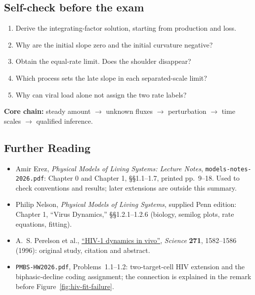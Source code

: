 \subsection*{Self-check before the exam}
\begin{enumerate}
\item Derive the integrating-factor solution, starting from production and loss.
\item Why are the initial slope zero and the initial curvature negative?
\item Obtain the equal-rate limit. Does the shoulder disappear?
\item Which process sets the late slope in each separated-scale limit?
\item Why can viral load alone not assign the two rate labels?
\end{enumerate}
\textbf{Core chain:} steady amount $\to$ unknown fluxes $\to$ perturbation $\to$ time scales $\to$ qualified inference.

\subsection*{Further Reading}
\begingroup\small
\begin{itemize}
\item Amir Erez, \emph{Physical Models of Living Systems: Lecture Notes}, \texttt{models-notes-2026.pdf}: Chapter 0 and Chapter 1, §§1.1--1.7, printed pp.~9--18. Used to check conventions and results; later extensions are outside this summary.
\item Philip Nelson, \emph{Physical Models of Living Systems}, supplied Penn edition: Chapter 1, ``Virus Dynamics,'' §§1.2.1--1.2.6 (biology, semilog plots, rate equations, fitting).
\item A.~S. Perelson et al., \href{https://pubmed.ncbi.nlm.nih.gov/8599114/}{``HIV-1 dynamics in vivo''}, \emph{Science} \textbf{271}, 1582--1586 (1996): original study, citation and abstract.
\item \texttt{PMBS-HW2026.pdf}, Problems~1.1--1.2: two-target-cell HIV extension and the biphasic-decline coding assignment; the connection is explained in the remark before Figure~\ref{fig:hiv-fit-failure}.
\end{itemize}
\endgroup

